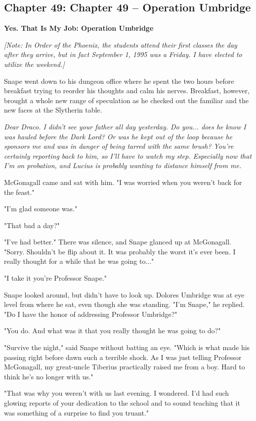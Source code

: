 \documentclass[a4paper,11pt]{article}
\begin{document}
\subsection{Chapter 49: Chapter 49 – Operation Umbridge}

\textbf{Yes. That Is My Job: Operation Umbridge}

\emph{[Note: In Order of the Phoenix, the students attend their first classes the day after they arrive, but in fact September 1, 1995 was a Friday. I have elected to utilize the weekend.]}

Snape went down to his dungeon office where he spent the two hours before breakfast trying to reorder his thoughts and calm his nerves. Breakfast, however, brought a whole new range of speculation as he checked out the familiar and the new faces at the Slytherin table.

\emph{Dear Draco. I didn't see your father all day yesterday. Do you... does he know I was hauled before the Dark Lord? Or was he kept out of the loop because he sponsors me and was in danger of being tarred with the same brush? You're certainly reporting back to him, so I'll have to watch my step. Especially now that I'm on probation, and Lucius is probably wanting to distance himself from me.}

McGonagall came and sat with him. "I was worried when you weren't back for the feast."

"I'm glad someone was."

"That bad a day?"

"I've had better." There was silence, and Snape glanced up at McGonagall. "Sorry. Shouldn't be flip about it. It was probably the worst it's ever been. I really thought for a while that he was going to..."

"I take it you're Professor Snape."

Snape looked around, but didn't have to look up. Dolores Umbridge was at eye level from where he sat, even though she was standing. "I'm Snape," he replied. "Do I have the honor of addressing Professor Umbridge?"

"You do. And what was it that you really thought he was going to do?"

"Survive the night," said Snape without batting an eye. "Which is what made his passing right before dawn such a terrible shock. As I was just telling Professor McGonagall, my great-uncle Tiberius practically raised me from a boy. Hard to think he's no longer with us."

"That was why you weren't with us last evening. I wondered. I'd had such glowing reports of your dedication to the school and to sound teaching that it was something of a surprise to find you truant."
\end{document}
